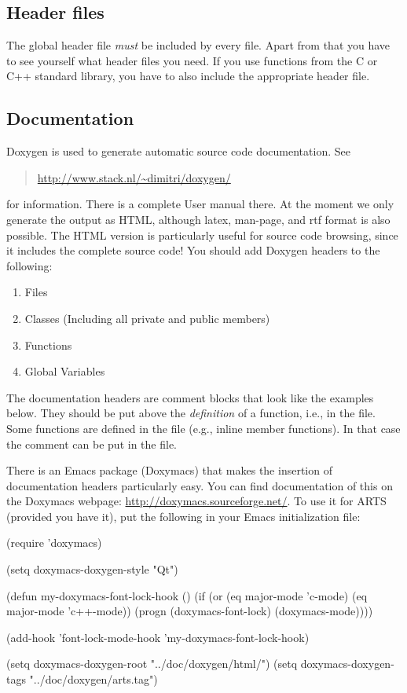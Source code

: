 \subsection{Header files} 
The global header file  \emph{must} be included by every
file. Apart from that you have to see yourself what header files you
need. If you use functions from the C or C++ standard library, you
have to also include the appropriate header file.

\subsection{Documentation}
Doxygen is used to generate automatic source code documentation. See
\begin{quote}
  \url{http://www.stack.nl/\~dimitri/doxygen/}
\end{quote}
for information. There is a complete User manual there. At the moment
we only generate the output as HTML, although latex, man-page, and rtf
format is also possible. The HTML version is particularly useful for
source code browsing, since it includes the complete source code! You
should add Doxygen headers to the following:

\begin{enumerate}
\item Files
\item Classes (Including all private and public members)
\item Functions
\item Global Variables
\end{enumerate}

The documentation headers are comment blocks that look like the
examples below. They should be put above the \emph{definition} of a
function, i.e., in the  file.  Some functions are defined in
the  file (e.g., inline member functions). In that case the
comment can be put in the  file.

There is an Emacs package (Doxymacs) that makes the insertion of
documentation headers particularly easy. You can find documentation of
this on the Doxymacs webpage: \url{http://doxymacs.sourceforge.net/}.
To use it for ARTS (provided you have it), put the following in your
Emacs initialization file:

\begin{code}
(require 'doxymacs)

(setq doxymacs-doxygen-style "Qt")

(defun my-doxymacs-font-lock-hook ()
  (if (or (eq major-mode 'c-mode) (eq major-mode 'c++-mode))
      (progn
        (doxymacs-font-lock)
        (doxymacs-mode))))

(add-hook 'font-lock-mode-hook 'my-doxymacs-font-lock-hook)

(setq doxymacs-doxygen-root "../doc/doxygen/html/")
(setq doxymacs-doxygen-tags "../doc/doxygen/arts.tag")
\end{code}

